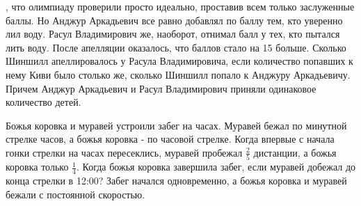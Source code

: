 \newpage

\hspace{3mm}

, что олимпиаду проверили просто идеально, проставив всем только заслуженные баллы. Но Анджур Аркадьевич все равно добавлял по баллу тем, кто уверенно лил воду. Расул Владимирович же, наоборот, отнимал балл у тех, кто пытался лить воду. После апелляции оказалось, что баллов стало на 15 больше. Сколько Шиншилл апеллировалось у Расула Владимировича, если количество попавших к нему Киви было столько же, сколько Шиншилл попало к Анджуру Аркадьевичу. Причем Анджур Аркадьевич и Расул Владимирович приняли одинаковое количество детей.

\hspace{3mm}


 Божья коровка и муравей устроили забег на часах. Муравей бежал по минутной стрелке часов, а божья коровка - по часовой стрелке. Когда впервые с начала гонки стрелки на часах пересеклись, муравей пробежал $\frac{2}{5}$ дистанции, а божья коровка только $\frac{1}{4}$. Когда божья коровка завершила забег, если муравей добежал до конца стрелки в 12:00? Забег начался одновременно, а божья коровка и муравей бежали с постоянной скоростью.